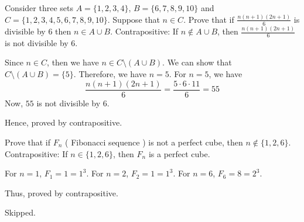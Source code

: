\bp
Consider three sets $A = \{1, 2, 3, 4\}$, $B = \{6, 7, 8, 9, 10\}$ and $C = \{1, 2, 3, 4, 5, 6, 7, 8, 9, 10\}$. Suppose that $n \in C$.
Prove that if $\frac{n(n+1)(2n+1)}{6}$ is divisible by $6$ then $n \in A \cup B$.
\ep
\bs
Contrapositive: If $n \not\in A \cup B$, then $\frac{n(n+1)(2n+1)}{6}$ is not divisible by $6$.

Since $n \in C$, then we have $n \in C \setminus (A \cup B)$.
We can show that $C \setminus (A \cup B) = \{ 5 \}$. 
Therefore, we have $n = 5$. For $n = 5$, we have
$$\frac{n(n+1)(2n+1)}{6} = \frac{5 \cdot 6 \cdot 11}{6} = 55$$
Now, $55$ is not divisible by $6$.

Hence, proved by contrapositive.
\es

\bp 
Prove that if $F_n$ ( Fibonacci sequence ) is not a perfect cube, then $n \not\in \{1, 2, 6\}$.
\ep
\bs
Contrapositive: If $n \in \{1, 2, 6\}$, then $F_n$ is a perfect cube.

For $n = 1$, $F_1 = 1 = 1^3$.
For $n = 2$, $F_2 = 1 = 1^3$.
For $n = 6$, $F_6 = 8 = 2^3$.

Thus, proved by contrapositive.
\es

\bp Skipped. \ep

